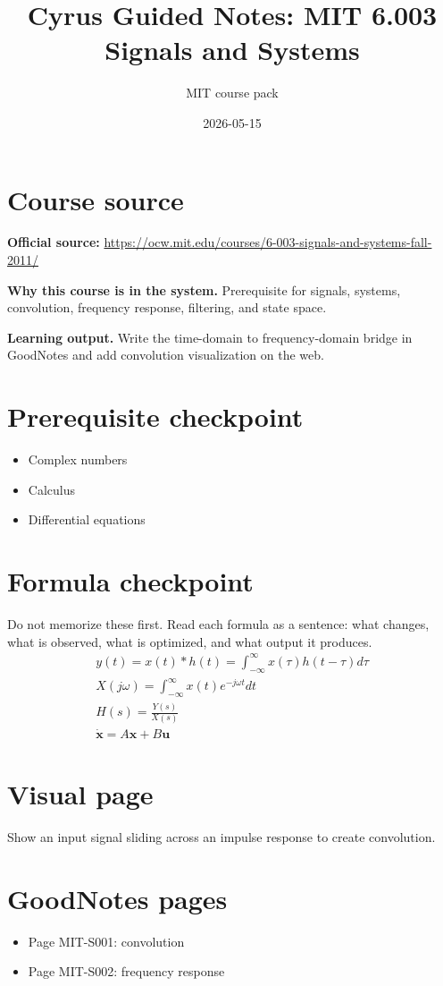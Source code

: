 \documentclass[11pt]{article}
\title{Cyrus Guided Notes: MIT 6.003 Signals and Systems}
\author{MIT course pack}
\date{2026-05-15}
\begin{document}
\maketitle

\section*{Course source}
\textbf{Official source:} \url{https://ocw.mit.edu/courses/6-003-signals-and-systems-fall-2011/}

\textbf{Why this course is in the system.} Prerequisite for signals, systems, convolution, frequency response, filtering, and state space.

\textbf{Learning output.} Write the time-domain to frequency-domain bridge in GoodNotes and add convolution visualization on the web.

\section*{Prerequisite checkpoint}
\begin{itemize}[leftmargin=1.4em]
  \item Complex numbers
  \item Calculus
  \item Differential equations
\end{itemize}

\section*{Formula checkpoint}
Do not memorize these first. Read each formula as a sentence: what changes, what is observed, what is optimized, and what output it produces.
\begin{align*}
  y(t)=x(t)*h(t)=\int_{-\infty}^{\infty}x(\tau)h(t-\tau)d\tau\\
  X(j\omega)=\int_{-\infty}^{\infty}x(t)e^{-j\omega t}dt\\
  H(s)=\frac{Y(s)}{X(s)}\\
  \dot{\bm{x}}=A\bm{x}+B\bm{u}
\end{align*}

\section*{Visual page}
Show an input signal sliding across an impulse response to create convolution.

\section*{GoodNotes pages}
\begin{itemize}[leftmargin=1.4em]
  \item Page MIT-S001: convolution
  \item Page MIT-S002: frequency response
\end{itemize}
\end{document}
